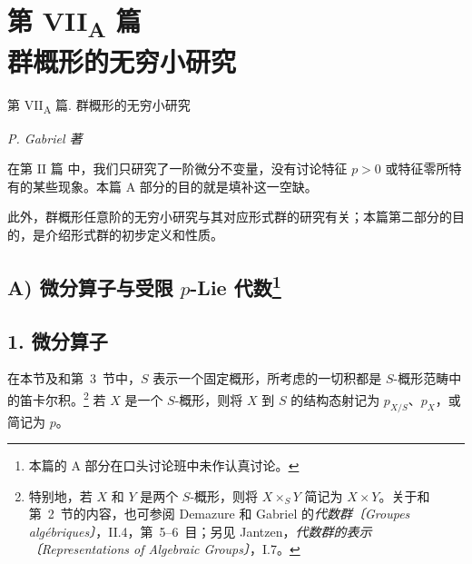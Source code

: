 
\chapter*{第 \texorpdfstring{VII\textsubscript{A}}{VII-A} 篇\\
群概形的无穷小研究}
\label{sga3:VIIA:title}
%
  {第 VII\textsubscript{A} 篇. 群概形的无穷小研究}

\begin{center}
  \textit{P. Gabriel 著}
\end{center}

在第 II 篇 中，我们只研究了一阶微分不变量，没有讨论特征 \(p>0\) 或特征零所特有的某些现象。本篇 A 部分的目的就是填补这一空缺。

此外，群概形任意阶的无穷小研究与其对应形式群的研究有关；本篇第二部分的目的，是介绍形式群的初步定义和性质。

\renewcommand{\thefootnote}{\fnsymbol{footnote}}
\setcounter{footnote}{0}
\section*{A) 微分算子与受限
  \texorpdfstring{\(p\)}{p}-Lie 代数\footnote{本篇的 A 部分在口头讨论班中未作认真讨论。}}
\label{sga3:VIIA:A}
\renewcommand{\thefootnote}{\arabic{footnote}}
\setcounter{footnote}{0}

\section*{1. 微分算子}
\label{sga3:VIIA:1}

在本节及和第~3~节中，\(S\) 表示一个固定概形，所考虑的一切积都是 \(S\)-概形范畴中的笛卡尔积。\footnote{特别地，若 \(X\) 和 \(Y\) 是两个 \(S\)-概形，则将 \(X\times_S Y\) 简记为 \(X\times Y\)。关于和第~2~节的内容，也可参阅 Demazure 和 Gabriel 的\emph{代数群〔Groupes alg\'ebriques〕}，II.4，第~5--6~目；另见 Jantzen，\emph{代数群的表示〔Representations of Algebraic Groups〕}，I.7。}
若 \(X\) 是一个 \(S\)-概形，则将 \(X\) 到 \(S\) 的结构态射记为 \(p_{X/S}\)、\(p_X\)，或简记为 \(p\)。

